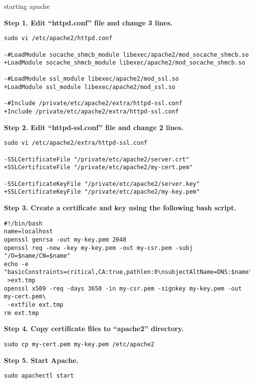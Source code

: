 \documentclass[12pt]{article}
\begin{document}
\begin{center}
{\sc starting apache}
\end{center}

\noindent
{\bf Step 1. Edit ``httpd.conf'' file and change 3 lines.}

\begin{Verbatim}
sudo vi /etc/apache2/httpd.conf

-#LoadModule socache_shmcb_module libexec/apache2/mod_socache_shmcb.so
+LoadModule socache_shmcb_module libexec/apache2/mod_socache_shmcb.so

-#LoadModule ssl_module libexec/apache2/mod_ssl.so
+LoadModule ssl_module libexec/apache2/mod_ssl.so

-#Include /private/etc/apache2/extra/httpd-ssl.conf
+Include /private/etc/apache2/extra/httpd-ssl.conf
\end{Verbatim}

\noindent
{\bf Step 2. Edit ``httpd-ssl.conf'' file and change 2 lines.}

\begin{Verbatim}
sudo vi /etc/apache2/extra/httpd-ssl.conf

-SSLCertificateFile "/private/etc/apache2/server.crt"
+SSLCertificateFile "/private/etc/apache2/my-cert.pem"

-SSLCertificateKeyFile "/private/etc/apache2/server.key"
+SSLCertificateKeyFile "/private/etc/apache2/my-key.pem"
\end{Verbatim}

\noindent
{\bf Step 3. Create a certificate and key using the following bash script.}

\begin{Verbatim}
#!/bin/bash
name=localhost
openssl genrsa -out my-key.pem 2048
openssl req -new -key my-key.pem -out my-csr.pem -subj "/O=$name/CN=$name"
echo -e "basicConstraints=critical,CA:true,pathlen:0\nsubjectAltName=DNS:$name"\
 >ext.tmp
openssl x509 -req -days 3650 -in my-csr.pem -signkey my-key.pem -out my-cert.pem\
 -extfile ext.tmp
rm ext.tmp
\end{Verbatim}

\noindent
{\bf Step 4. Copy certificate files to ``apache2'' directory.}

\begin{Verbatim}
sudo cp my-cert.pem my-key.pem /etc/apache2
\end{Verbatim}

\noindent
{\bf Step 5. Start Apache.}

\begin{Verbatim}
sudo apachectl start
\end{Verbatim}
\end{document}
